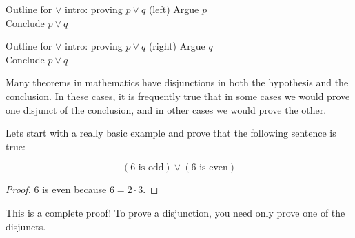 \begin{fitch*}
	\textrm{Outline for $\vee$ intro:  proving $p \vee q$ (left)}
	\hspace{1 cm}\textrm{Argue $p$}\\
	\hspace{1 cm}\textrm{Conclude $p \vee q$}
\end{fitch*}


\begin{fitch*}
	\textrm{Outline for $\vee$ intro:  proving $p \vee q$ (right)}
	\hspace{1 cm}\textrm{Argue  $q$}\\
	\hspace{1 cm}\textrm{Conclude $p \vee q$}
\end{fitch*}

Many theorems in mathematics have disjunctions in both the hypothesis and the conclusion.  In these cases, it is frequently true that in some cases we would prove one disjunct of the conclusion, and in other cases we would prove the other.

\begin{example}
	Lets start with a really basic example and prove that the following sentence is true:
	
	\[
	(\textrm{$6$ is odd}) \vee (\textrm{$6$ is even})
	\]
	
	\begin{proof}
		$6$ is even because $6 = 2 \cdot 3$. 
	\end{proof}
	
	This is a complete proof!  To prove a disjunction, you need only prove one of the disjuncts.
	
\end{example}

